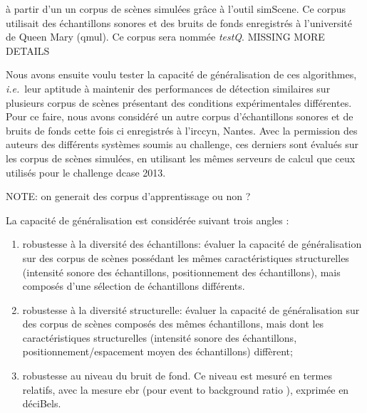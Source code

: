   à partir d'un un corpus de scènes simulées grâce à l'outil simScene. Ce corpus utilisait des échantillons sonores et des bruits de fonds enregistrés à l'université de Queen Mary (qmul). Ce corpus sera nommée \emph{testQ}. MISSING MORE DETAILS

  Nous avons ensuite voulu tester la capacité de généralisation de ces algorithmes, \textit{i.e.}~leur aptitude à maintenir des performances de détection similaires sur plusieurs corpus de scènes présentant des conditions expérimentales différentes. Pour ce faire, nous avons considéré un autre corpus d'échantillons sonores et de bruits de fonds  cette fois ci enregistrés à l'irccyn, Nantes. Avec la permission des auteurs des différents systèmes soumis au challenge, ces derniers sont évalués sur les corpus de scènes simulées, en utilisant les mêmes serveurs de calcul que ceux utilisés pour le challenge dcase 2013.

  NOTE: on generait des corpus d'apprentissage ou non ?

  La capacité de généralisation est considérée suivant trois angles :
  \begin{enumerate}
  \item robustesse à la diversité des échantillons: évaluer la capacité de généralisation sur des corpus de scènes possédant les mêmes caractéristiques structurelles (intensité sonore des échantillons, positionnement des échantillons), mais composés d'une sélection de échantillons différents.
  \item robustesse à la diversité structurelle: évaluer la capacité de généralisation sur des corpus de scènes composés des mêmes échantillons, mais dont les caractéristiques structurelles (intensité sonore des échantillons, positionnement/espacement moyen des échantillons) diffèrent;
  \item robustesse au niveau du bruit de fond. Ce niveau est mesuré en termes relatifs, avec la mesure ebr (pour \og event to background ratio \fg), exprimée en déciBels.
  \end{enumerate}

